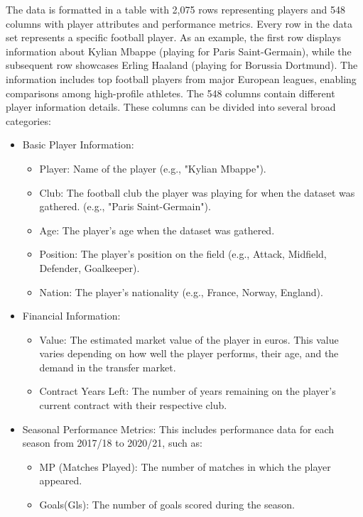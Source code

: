 \documentclass[12pt, a4paper,oneside]{book}
\numberwithin{equation}{section}
\begin{document}
The data is formatted in a table with 2,075 rows representing players and 548 columns with player attributes and performance metrics. Every row in the data set represents a specific football player. As an example, the first row displays information about Kylian Mbappe (playing for Paris Saint-Germain), while the subsequent row showcases Erling Haaland (playing for Borussia Dortmund). The information includes top football players from major European leagues, enabling comparisons among high-profile athletes. The 548 columns contain different player information details. These columns can be divided into several broad categories:

\begin{itemize}
    \item Basic Player Information:
    \begin{itemize}
        \item Player: Name of the player (e.g., "Kylian Mbappe").
        \item Club: The football club the player was playing for when the dataset was gathered. (e.g., "Paris Saint-Germain").
        \item Age: The player's age when the dataset was gathered.
        \item Position: The player's position on the field  (e.g., Attack, Midfield, Defender, Goalkeeper).
        \item Nation: The player's nationality (e.g., France, Norway, England).
    \end{itemize}
    \item Financial Information:
    \begin{itemize}
        \item Value: The estimated market value of the player in euros. This value varies depending on how well the player performs, their age, and the demand in the transfer market.
        \item Contract Years Left: The number of years remaining on the player's current contract with their respective club.
    \end{itemize}
    \item Seasonal Performance Metrics: This includes performance data for each season from 2017/18 to 2020/21, such as:
    \begin{itemize}
        \item MP (Matches Played): The number of matches in which the player appeared.
        \item Goals(Gls): The number of goals scored during the season.

\end{itemize}
\end{itemize}
\end{document}
